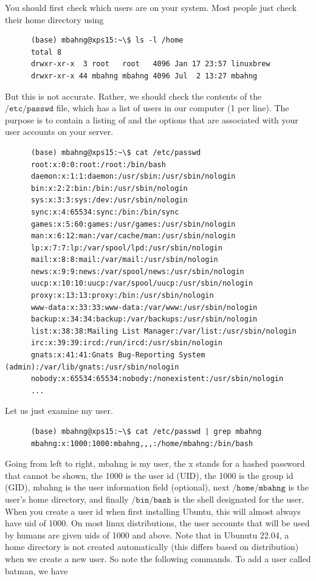 \documentclass{article}
\begin{document}
      You should first check which users are on your system. Most people just check their home directory using 
      \begin{lstlisting}
      (base) mbahng@xps15:~\$ ls -l /home
      total 8
      drwxr-xr-x  3 root   root   4096 Jan 17 23:57 linuxbrew
      drwxr-xr-x 44 mbahng mbahng 4096 Jul  2 13:27 mbahng
      \end{lstlisting}
      But this is not accurate. Rather, we should check the contents of the $\texttt{/etc/passwd}$ file, which has a list of users in our computer (1 per line). The purpose is to contain a listing of and the options that are associated with your user accounts on your server. 
      \begin{lstlisting}
      (base) mbahng@xps15:~\$ cat /etc/passwd
      root:x:0:0:root:/root:/bin/bash
      daemon:x:1:1:daemon:/usr/sbin:/usr/sbin/nologin
      bin:x:2:2:bin:/bin:/usr/sbin/nologin
      sys:x:3:3:sys:/dev:/usr/sbin/nologin
      sync:x:4:65534:sync:/bin:/bin/sync
      games:x:5:60:games:/usr/games:/usr/sbin/nologin
      man:x:6:12:man:/var/cache/man:/usr/sbin/nologin
      lp:x:7:7:lp:/var/spool/lpd:/usr/sbin/nologin
      mail:x:8:8:mail:/var/mail:/usr/sbin/nologin
      news:x:9:9:news:/var/spool/news:/usr/sbin/nologin
      uucp:x:10:10:uucp:/var/spool/uucp:/usr/sbin/nologin
      proxy:x:13:13:proxy:/bin:/usr/sbin/nologin
      www-data:x:33:33:www-data:/var/www:/usr/sbin/nologin
      backup:x:34:34:backup:/var/backups:/usr/sbin/nologin
      list:x:38:38:Mailing List Manager:/var/list:/usr/sbin/nologin
      irc:x:39:39:ircd:/run/ircd:/usr/sbin/nologin
      gnats:x:41:41:Gnats Bug-Reporting System (admin):/var/lib/gnats:/usr/sbin/nologin
      nobody:x:65534:65534:nobody:/nonexistent:/usr/sbin/nologin
      ...
      \end{lstlisting}
      Let us just examine my user. 
      \begin{lstlisting}
      (base) mbahng@xps15:~\$ cat /etc/passwd | grep mbahng
      mbahng:x:1000:1000:mbahng,,,:/home/mbahng:/bin/bash
      \end{lstlisting}
      Going from left to right, mbahng is my user, the x stands for a hashed password that cannot be shown, the 1000 is the user id (UID), the 1000 is the group id (GID), mbahng is the user information field (optional), next $\texttt{/home/mbahng}$ is the user's home directory, and finally $\texttt{/bin/bash}$ is the shell designated for the user. When you create a user id when first installing Ubuntu, this will almost always have uid of 1000. On most linux distributions, the user accounts that will be used by humans are given uids of 1000 and above. Note that in Ubunutu 22.04, a home directory is not created automatically (this differs based on distribution) when we create a new user. So note the following commands. To add a user called batman, we have 
\end{document}
